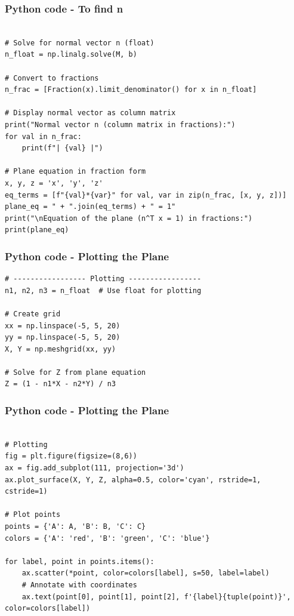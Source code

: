 \documentclass{beamer}
\begin{document}
\begin{frame}[fragile]                            
\frametitle{Python code - To find n }                
\begin{lstlisting}

# Solve for normal vector n (float)
n_float = np.linalg.solve(M, b)

# Convert to fractions
n_frac = [Fraction(x).limit_denominator() for x in n_float]

# Display normal vector as column matrix
print("Normal vector n (column matrix in fractions):")
for val in n_frac:
    print(f"| {val} |")

# Plane equation in fraction form
x, y, z = 'x', 'y', 'z'
eq_terms = [f"{val}*{var}" for val, var in zip(n_frac, [x, y, z])]
plane_eq = " + ".join(eq_terms) + " = 1"
print("\nEquation of the plane (n^T x = 1) in fractions:")
print(plane_eq)

\end{lstlisting}
\end{frame}

\begin{frame}[fragile]                            
\frametitle{Python code - Plotting the Plane}                
\begin{lstlisting}
# ----------------- Plotting -----------------
n1, n2, n3 = n_float  # Use float for plotting

# Create grid
xx = np.linspace(-5, 5, 20)
yy = np.linspace(-5, 5, 20)
X, Y = np.meshgrid(xx, yy)

# Solve for Z from plane equation
Z = (1 - n1*X - n2*Y) / n3
\end{lstlisting}
\end{frame}

\begin{frame}[fragile]                            
\frametitle{Python code - Plotting the Plane}                
\begin{lstlisting}

# Plotting
fig = plt.figure(figsize=(8,6))
ax = fig.add_subplot(111, projection='3d')
ax.plot_surface(X, Y, Z, alpha=0.5, color='cyan', rstride=1, cstride=1)

# Plot points
points = {'A': A, 'B': B, 'C': C}
colors = {'A': 'red', 'B': 'green', 'C': 'blue'}

for label, point in points.items():
    ax.scatter(*point, color=colors[label], s=50, label=label)
    # Annotate with coordinates
    ax.text(point[0], point[1], point[2], f'{label}{tuple(point)}', color=colors[label])
\end{lstlisting}
\end{frame}
\end{document}
